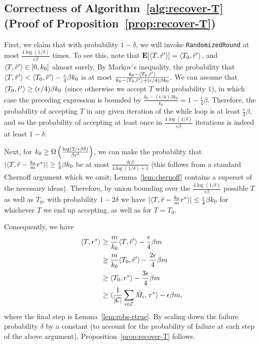 \subsection{Correctness of Algorithm~\ref{alg:recover-T} (Proof of Proposition~\ref{prop:recover-T})}
\label{sec:recover-T-proof}

First, we claim that with probability $1-\delta$, we will invoke 
\texttt{RandomizedRound} at most $\frac{4\log(1/\delta)}{\epsilon\beta}$ times. 
To see this, note that $\mathbf{E}[\langle T, \tilde{r}' \rangle] = \langle T_0, \tilde{r}' \rangle$, and 
$\langle T, \tilde{r}' \rangle \in [0, k_0]$ almost surely. 
By Markov's inequality, the probability that 
$\langle T, \tilde{r}' \rangle < \langle T_0, \tilde{r}' \rangle - \frac{\epsilon}{4}\beta k_0$ is at most $\frac{k_0 - \langle T_0, \tilde{r}' \rangle}{k_0 - \langle T_0, \tilde{r}' \rangle + (\epsilon/4)\beta k_0}$. We can assume that 
$\langle T_0, \tilde{r}' \rangle \geq (\epsilon/4)\beta k_0$ (since otherwise 
we accept $T$ with probability $1$), in which case the preceding expression 
is bounded by 
$\frac{k_0 - (\epsilon/4)\beta k_0}{k_0} = 1 - \frac{\epsilon}{4}\beta$. 
Therefore, the probability of accepting $T$ in any given iteration of the while 
loop is at least $\frac{\epsilon}{4}\beta$, and so the probability of 
accepting at least once in $\frac{4\log(1/\delta)}{\epsilon\beta}$ iterations is 
indeed at least $1 - \delta$.

Next, for $k_0 \geq \Omega\left( \frac{\log(2/\epsilon\beta\delta)}{\beta \epsilon^2} \right)$, 
we can make the probability that $|\langle T, \tilde{r} - \frac{k_0}{m}r^* \rangle| \geq \frac{\epsilon}{4} \beta k_0$ be at most $\frac{\delta\epsilon\beta}{4\log(1/\delta)+1}$ (this follows from a standard Chernoff argument which we omit; 
Lemma~\ref{lem:chernoff} contains a superset of the necessary ideas). 
Therefore, by union bounding over the $\frac{4\log(1/\delta)}{\epsilon\beta}$ 
possible $T$ as well as $T_0$, with probability $1-2\delta$ we have $|\langle T, \tilde{r} - \frac{k_0}{m} r^* \rangle| \leq \frac{\epsilon}{4}\beta k_0$ for whichever $T$ we end up accepting, as well as for $T = T_0$.

Consequently, we have
\begin{align}
\langle T, r^* \rangle &\geq \frac{m}{k_0} \langle T, \tilde{r}' \rangle - \frac{\epsilon}{4}\beta m \\
 &\geq \frac{m}{k_0} \langle T_0, \tilde{r}' \rangle - \frac{2\epsilon}{4}\beta m \\
 &\geq \langle T_0, r^* \rangle - \frac{3\epsilon}{4}\beta m \\
 &\geq \langle \frac{1}{|\mathcal{C}|} \sum_{i \in \mathcal{C}} \tilde{M}_i,\, r^* \rangle - \epsilon\beta m,
\end{align}
where the final step is Lemma~\ref{lem:robs-rtrue}.
By scaling down the failure probability $\delta$ by a constant 
(to account for the probability of failure at each step of the above argument), 
Proposition~\ref{prop:recover-T} follows.
